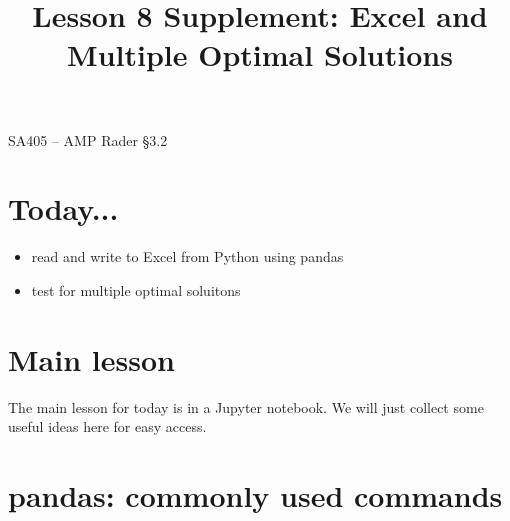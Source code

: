 \documentclass[11pt]{article}
\makeatletter
\theoremstyle{definition}
\renewcommand{\maketitle}{
  \noindent SA405 -- AMP \hfill Rader \S 3.2 \\

  \begin{center}\Large{\textbf{\@title}}\end{center}
}
\makeatother
\begin{document}
  
\title{Lesson 8  Supplement:  Excel and Multiple Optimal Solutions}

\maketitle

\section{Today...}

\begin{itemize}
	\item  read and write to Excel from Python using pandas
	\item  test for multiple optimal soluitons
\end{itemize}

\section{Main lesson}
The main lesson for today is in a Jupyter notebook.  We will just collect some useful ideas here for easy access.

\section{pandas: commonly used commands}
\end{document}
